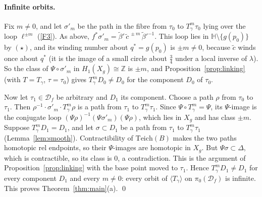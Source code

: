 \documentclass[11pt]{article}
\theoremstyle{definition}
\newcommand{\Teich}{\mathrm{Teich}}
\newcommand{\HH}{\mathbb H}
\newcommand{\D}{\mathcal D}
\begin{document}
\paragraph{Infinite orbits.} Fix $m\ne0$, and let $\sigma'_m$ be the path in the fibre from $\tau_0$ to $T_\gamma^m\tau_0$ lying over the loop $\ell^{\pm m}$ (\ref{F3}). As above, $f^*\sigma'_m=\tilde\beta'\,\tilde c^{\,\pm m}\,\tilde\beta'^{-1}$. This loop lies in $\HH\setminus\{g(p_0)\}$ by $(\star)$, and its winding number about $q^*=g(p_0)$ is $\pm m\ne0$, because $\tilde c$ winds once about $q^*$ (it is the image of a small circle about $\tfrac34$ under a local inverse of $\lambda$). So the class of $\Psi\circ\sigma'_m$ in $H_1(X_g)\cong\mathbb Z$ is $\pm m$, and Proposition~\ref{prop:linking} (with $T=T_\gamma$, $\tau=\tau_0$) gives $T_\gamma^mD_0\ne D_0$ for the component $D_0$ of $\tau_0$.

Now let $\tau_1\in\D_f$ be arbitrary and $D_1$ its component. Choose a path $\rho$ from $\tau_0$ to $\tau_1$. Then $\rho^{-1}\cdot\sigma'_m\cdot T_\gamma^m\rho$ is a path from $\tau_1$ to $T_\gamma^m\tau_1$. Since $\Psi\circ T_\gamma^m=\Psi$, its $\Psi$-image is the conjugate loop $(\Psi\rho)^{-1}(\Psi\sigma'_m)(\Psi\rho)$, which lies in $X_g$ and has class $\pm m$. Suppose $T_\gamma^mD_1=D_1$, and let $\sigma\subset D_1$ be a path from $\tau_1$ to $T_\gamma^m\tau_1$ (Lemma~\ref{lem:smooth}). Contractibility of $\Teich(B)$ makes the two paths homotopic rel endpoints, so their $\Psi$-images are homotopic in $X_g$. But $\Psi\sigma\subset\Delta$, which is contractible, so its class is $0$, a contradiction. This is the argument of Proposition~\ref{prop:linking} with the base point moved to $\tau_1$. Hence $T_\gamma^mD_1\ne D_1$ for every component $D_1$ and every $m\ne0$: every orbit of $\langle T_\gamma\rangle$ on $\pi_0(\D_f)$ is infinite. This proves Theorem~\ref{thm:main}(a). \qed
\end{document}
